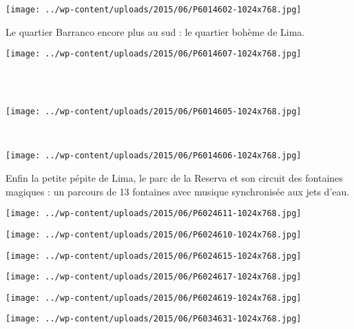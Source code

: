 \begin{center} \texttt{[image: ../wp-content/uploads/2015/06/P6014602-1024x768.jpg]} \end{center}
 \vspace{-\topsep}
 \vspace{-3.25mm}
\pagebreak

Le quartier Barranco encore plus au sud : le quartier bohème de Lima. 

\begin{center} \texttt{[image: ../wp-content/uploads/2015/06/P6014607-1024x768.jpg]} \end{center}
~\\~\\
\begin{center} \texttt{[image: ../wp-content/uploads/2015/06/P6014605-1024x768.jpg]} \end{center}
\vspace{-\topsep}
\pagebreak
~
\begin{center} \texttt{[image: ../wp-content/uploads/2015/06/P6014606-1024x768.jpg]} \end{center}

Enfin la petite pépite de Lima, le parc de la Reserva et son circuit des fontaines magiques : un parcours de 13 fontaines avec musique synchronisée aux jets d'eau. 

\begin{center} \texttt{[image: ../wp-content/uploads/2015/06/P6024611-1024x768.jpg]} \end{center}

\begin{center} \texttt{[image: ../wp-content/uploads/2015/06/P6024610-1024x768.jpg]} \end{center}

\begin{center} \texttt{[image: ../wp-content/uploads/2015/06/P6024615-1024x768.jpg]} \end{center}

\begin{center} \texttt{[image: ../wp-content/uploads/2015/06/P6024617-1024x768.jpg]} \end{center}

\begin{center} \texttt{[image: ../wp-content/uploads/2015/06/P6024619-1024x768.jpg]} \end{center}

\begin{center} \texttt{[image: ../wp-content/uploads/2015/06/P6034631-1024x768.jpg]} \end{center}